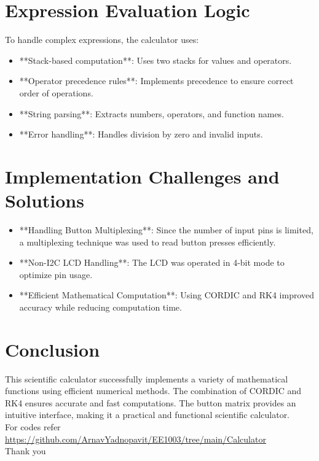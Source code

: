 \documentclass[a4paper,12pt]{article}
\begin{document}
\section{Expression Evaluation Logic}
To handle complex expressions, the calculator uses:
\begin{itemize}
    \item **Stack-based computation**: Uses two stacks for values and operators.
    \item **Operator precedence rules**: Implements precedence to ensure correct order of operations.
    \item **String parsing**: Extracts numbers, operators, and function names.
    \item **Error handling**: Handles division by zero and invalid inputs.
\end{itemize}

\section{Implementation Challenges and Solutions}
\begin{itemize}
    \item **Handling Button Multiplexing**: Since the number of input pins is limited, a multiplexing technique was used to read button presses efficiently.
    \item **Non-I2C LCD Handling**: The LCD was operated in 4-bit mode to optimize pin usage.
    \item **Efficient Mathematical Computation**: Using CORDIC and RK4 improved accuracy while reducing computation time.
\end{itemize}

\section{Conclusion}
This scientific calculator successfully implements a variety of mathematical functions using efficient numerical methods. The combination of CORDIC and RK4 ensures accurate and fast computations. The button matrix provides an intuitive interface, making it a practical and functional scientific calculator.\\
For codes refer\\
\url{https://github.com/ArnavYadnopavit/EE1003/tree/main/Calculator}\\

\centering
Thank you
\end{document}
